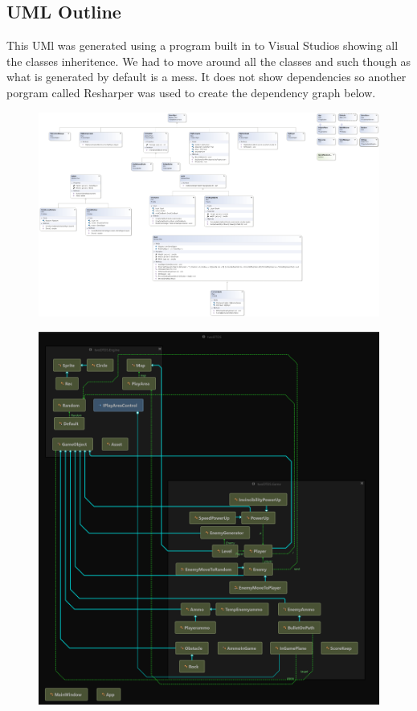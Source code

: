 \documentclass[10pt,conference,onecolumn,compsoc]{IEEEtran}
\begin{document}
\subsection{UML Outline}
This UMl was generated using a program built in to Visual Studios showing all the classes inheritence. We had to move around all the classes and such though as what is generated by default is a mess. It does not show dependencies so another porgram called Resharper was used to create the dependency graph below.
\begin{figure}[ht!]
\includegraphics[scale=.25]{ClassDiagram1.png}
\caption{}
\label{UML}
\end{figure}
\begin{figure}[ht!]
\includegraphics[scale=.25]{Dependencies Graph.png}
\caption{}
\label{UML}
\end{figure} \\\\\\\\
\end{document}
